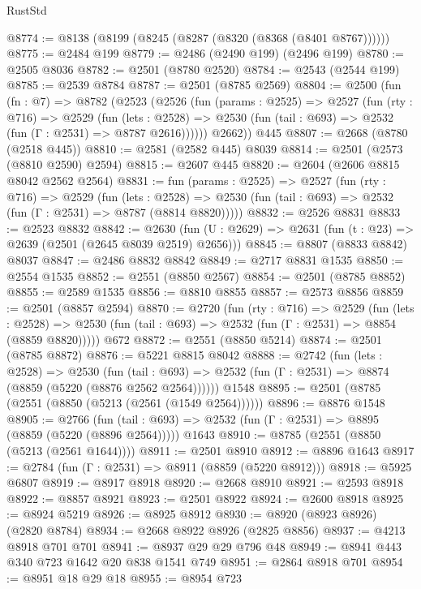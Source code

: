 \begin{lexlean}{RustStd}
\begin{coremodule}
@8774 := @8138 (@8199 (@8245 (@8287 (@8320 (@8368 (@8401 @8767))))))
@8775 := @2484 @199
@8779 := @2486 (@2490 @199) (@2496 @199)
@8780 := @2505 @8036
@8782 := @2501 (@8780 @2520)
@8784 := @2543 (@2544 @199)
@8785 := @2539 @8784
@8787 := @2501 (@8785 @2569)
@8804 := @2500
    (fun (fn : @7) =>
    @8782
      (@2523
        (@2526
          (fun (params : @2525) =>
          @2527
            (fun (rty : @716) =>
            @2529
              (fun (lets : @2528) =>
              @2530 (fun (tail : @693) => @2532 (fun (Γ : @2531) => @8787 @2616))))))
        @2662))
    @445
@8807 := @2668 (@8780 (@2518 @445))
@8810 := @2581 (@2582 @445) @8039
@8814 := @2501 (@2573 (@8810 @2590) @2594)
@8815 := @2607 @445
@8820 := @2604 (@2606 @8815 @8042 @2562 @2564)
@8831 := fun (params : @2525) =>
  @2527
    (fun (rty : @716) =>
    @2529
      (fun (lets : @2528) =>
      @2530 (fun (tail : @693) => @2532 (fun (Γ : @2531) => @8787 (@8814 @8820)))))
@8832 := @2526 @8831
@8833 := @2523 @8832
@8842 := @2630 (fun (U : @2629) => @2631 (fun (t : @23) => @2639 (@2501 (@2645 @8039 @2519) @2656)))
@8845 := @8807 (@8833 @8842) @8037
@8847 := @2486 @8832 @8842
@8849 := @2717 @8831 @1535
@8850 := @2554 @1535
@8852 := @2551 (@8850 @2567)
@8854 := @2501 (@8785 @8852)
@8855 := @2589 @1535
@8856 := @8810 @8855
@8857 := @2573 @8856
@8859 := @2501 (@8857 @2594)
@8870 := @2720
    (fun (rty : @716) =>
    @2529
      (fun (lets : @2528) =>
      @2530 (fun (tail : @693) => @2532 (fun (Γ : @2531) => @8854 (@8859 @8820)))))
    @672
@8872 := @2551 (@8850 @5214)
@8874 := @2501 (@8785 @8872)
@8876 := @5221 @8815 @8042
@8888 := @2742
    (fun (lets : @2528) =>
    @2530
      (fun (tail : @693) => @2532 (fun (Γ : @2531) => @8874 (@8859 (@5220 (@8876 @2562 @2564))))))
    @1548
@8895 := @2501 (@8785 (@2551 (@8850 (@5213 (@2561 (@1549 @2564))))))
@8896 := @8876 @1548
@8905 := @2766
    (fun (tail : @693) => @2532 (fun (Γ : @2531) => @8895 (@8859 (@5220 (@8896 @2564)))))
    @1643
@8910 := @8785 (@2551 (@8850 (@5213 (@2561 @1644))))
@8911 := @2501 @8910
@8912 := @8896 @1643
@8917 := @2784 (fun (Γ : @2531) => @8911 (@8859 (@5220 @8912)))
@8918 := @5925 @6807
@8919 := @8917 @8918
@8920 := @2668 @8910
@8921 := @2593 @8918
@8922 := @8857 @8921
@8923 := @2501 @8922
@8924 := @2600 @8918
@8925 := @8924 @5219
@8926 := @8925 @8912
@8930 := @8920 (@8923 @8926) (@2820 @8784)
@8934 := @2668 @8922 @8926 (@2825 @8856)
@8937 := @4213 @8918 @701 @701
@8941 := @8937 @29 @29 @796 @48
@8949 := @8941 @443 @340 @723 @1642 @20 @838 @1541 @749
@8951 := @2864 @8918 @701
@8954 := @8951 @18 @29 @18
@8955 := @8954 @723

\end{coremodule}
\end{lexlean}
